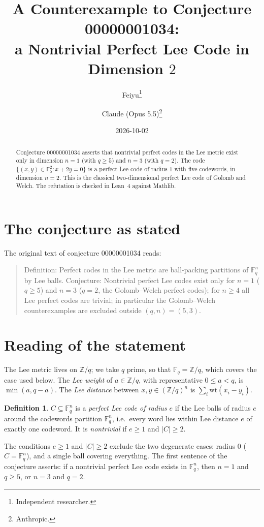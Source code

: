 \documentclass[11pt]{article}
\title{A Counterexample to Conjecture 00000001034:\\
a Nontrivial Perfect Lee Code in Dimension $2$}
\author{%
  Feiyu\thanks{Independent researcher.}
  \and
  Claude (Opus 5.5)\thanks{Anthropic.}%
}
\date{2026-10-02}
\theoremstyle{plain}
\theoremstyle{definition}
\newtheorem{definition}[theorem]{Definition}
\theoremstyle{remark}
\newcommand{\F}{\mathbb F}
\begin{document}
\maketitle

\begin{abstract}
Conjecture 00000001034 asserts that nontrivial perfect codes in the Lee metric
exist only in dimension $n=1$ (with $q\ge5$) and $n=3$ (with $q=2$). The code
$\{(x,y)\in\F_5^2 : x+2y=0\}$ is a perfect Lee code of radius $1$ with five
codewords, in dimension $n=2$. This is the classical two-dimensional perfect
Lee code of Golomb and Welch. The refutation is checked in Lean~4 against
Mathlib.
\end{abstract}

\section{The conjecture as stated}

The original text of conjecture 00000001034 reads:

\begin{quote}
Definition: Perfect codes in the Lee metric are ball-packing partitions of
$\F_q^n$ by Lee balls. Conjecture: Nontrivial perfect Lee codes exist only for
$n = 1$ ($q \ge 5$) and $n = 3$ ($q = 2$, the Golomb--Welch perfect codes); for
$n \ge 4$ all Lee perfect codes are trivial; in particular the Golomb--Welch
counterexamples are excluded outside $(q,n) = (5,3)$.
\end{quote}

\section{Reading of the statement}

The Lee metric lives on $\mathbb Z/q$; we take $q$ prime, so that
$\F_q=\mathbb Z/q$, which covers the case used below. The \emph{Lee weight} of
$a\in\mathbb Z/q$, with representative $0\le a<q$, is $\min(a,q-a)$. The
\emph{Lee distance} between $x,y\in(\mathbb Z/q)^n$ is
$\sum_i \mathrm{wt}(x_i-y_i)$.

\begin{definition}
$C\subseteq\F_q^n$ is a \emph{perfect Lee code of radius $e$} if the Lee balls
of radius $e$ around the codewords partition $\F_q^n$, i.e.\ every word lies
within Lee distance $e$ of exactly one codeword. It is \emph{nontrivial} if
$e\ge1$ and $|C|\ge2$.
\end{definition}

The conditions $e\ge1$ and $|C|\ge2$ exclude the two degenerate cases: radius
$0$ ($C=\F_q^n$), and a single ball covering everything. The first sentence of
the conjecture asserts: if a nontrivial perfect Lee code exists in $\F_q^n$,
then $n=1$ and $q\ge5$, or $n=3$ and $q=2$.
\end{document}
